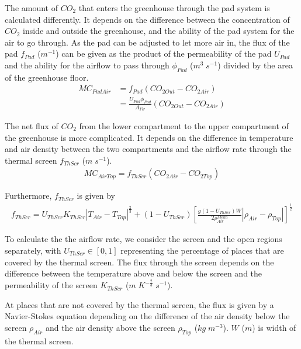 \documentclass[a4paper]{article}
\begin{document}
The amount of \(CO_2\) that enters the greenhouse through the pad system is calculated differently.
It depends on the difference between the concentration of \(CO_2\) inside and outside the greenhouse, and the ability of the pad system for the air to go through.
As the pad can be adjusted to let more air in, the flux of the pad \(f_{Pad}\) (\(m^{-1}\)) can be given as the product of the permeability of the pad \(U_{Pad}\) and the ability for the airflow to pass through \(\phi_{Pad}\) (\(m^3\;s^{-1}\)) divided by the area of the greenhouse floor.
\begin{equation}
  \begin{split}
    MC_{PadAir} & = f_{Pad} (CO_{2 Out} - CO_{2 Air}) \\
    & = \frac{U_{Pad} \phi_{Pad}}{A_{Flr}} (CO_{2 Out} - CO_{2 Air})
  \end{split}
\end{equation}

The net flux of \(CO_2\) from the lower compartment to the upper compartment of the greenhouse is more complicated.
It depends on the difference in temperature and air density between the two compartments and the airflow rate through the thermal screen \(f_{ThScr}\) (\(m\;s^{-1}\)).
\begin{align}
  MC_{AirTop} = f_{ThScr} (CO_{2 Air} - CO_{2 Top})
\end{align}

Furthermore, \(f_{ThScr}\) is given by
\begin{align}
  f_{ThScr} = U_{ThScr} K_{ThScr} |T_{Air} - T_{Top}| ^{\frac{2}{3}} + (1 - U_{ThScr}) {\left[\frac{g(1 - U_{ThScr})W}{2\rho^{Mean}_{Air}} |\rho_{Air} - \rho_{Top}|\right]}^{\frac{1}{2}}
\end{align}

To calculate the the airflow rate, we consider the screen and the open regions separately, with \(U_{ThScr} \in [0,1]\) representing the percentage of places that are covered by the thermal screen. The flux through the screen depends on the difference between the temperature above and below the screen and the permeability of the screen \(K_{ThScr}\) (\(m\;K^{-\frac{2}{3}}\;s^{-1}\)).

At places that are not covered by the thermal screen, the flux is given by a Navier-Stokes equation depending on the difference of the air density below the screen \(\rho_{Air}\) and the air density above the screen \(\rho_{Top}\) (\(kg\;m^{-3}\)). \(W\) (\(m\)) is width of the thermal screen.
\end{document}

